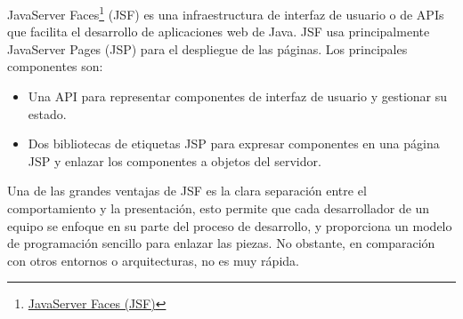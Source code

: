 
JavaServer Faces\footnote{\href{https://www.juntadeandalucia.es/servicios/madeja/contenido/recurso/101}{JavaServer Faces (JSF)}} (JSF) es una infraestructura de interfaz de usuario o de APIs que facilita el desarrollo de aplicaciones web de Java. JSF usa principalmente JavaServer Pages (JSP) para el despliegue de las páginas. Los principales componentes son:
\begin{itemize}
    \item Una API para representar componentes de interfaz de usuario y gestionar su estado.
    \item Dos bibliotecas de etiquetas JSP para expresar componentes en una página JSP y enlazar los componentes a objetos del servidor.
\end{itemize}
Una de las grandes ventajas de JSF es la clara separación entre el comportamiento y la presentación, esto permite que cada desarrollador de un equipo se enfoque en su parte del proceso de desarrollo, y proporciona un modelo de programación sencillo para enlazar las piezas. No obstante, en comparación con otros entornos o arquitecturas, no es muy rápida.